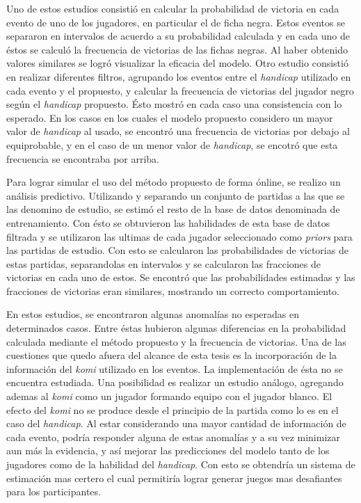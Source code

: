 \documentclass[11pt,twoside,spanish]{report} %
\begin{document}
Uno de estos estudios consisti\'o en calcular la probabilidad de victoria en cada evento de uno de los jugadores, en particular el de ficha negra.
Estos eventos se separaron en intervalos de acuerdo a su probabilidad calculada y en cada uno de \'estos se calcul\'o la frecuencia de victorias de las fichas negras.
Al haber obtenido valores similares se logr\'o visualizar la eficacia del modelo.
Otro estudio consisti\'o en realizar diferentes filtros, agrupando los eventos entre el \textit{handicap} utilizado en cada evento y el propuesto, y calcular la frecuencia de victorias del jugador negro seg\'un el \textit{handicap} propuesto.
\'Esto mostr\'o en cada caso una consistencia con lo esperado.
En los casos en los cuales el modelo propuesto considero un mayor valor de \textit{handicap} al usado, se encontr\'o una frecuencia de victorias por debajo al equiprobable, y en el caso de un menor valor de \textit{handicap}, se encotr\'o que esta frecuencia se encontraba por arriba.

Para lograr simular el uso del m\'etodo propuesto de forma \'online, se realizo un  an\'alisis predictivo.
Utilizando y separando un conjunto de partidas a las que se las denomino de estudio, se estim\'o el resto de la base de datos denominada de entrenamiento.
Con \'esto se obtuvieron las habilidades de esta base de datos filtrada y se utilizaron las ultimas de cada jugador seleccionado como \textit{priors} para las partidas de estudio.
Con esto se calcularon las probabilidades de victorias de estas partidas, separandolas en intervalos y se calcularon las fracciones de victorias en cada uno de estos.
Se encontr\'o que las probabilidades estimadas y las fracciones de victorias eran similares, mostrando un correcto comportamiento.

En estos estudios, se encontraron algunas anomal\'ias no esperadas en determinados casos.
Entre \'estas hubieron algunas diferencias en la probabilidad calculada mediante el m\'etodo propuesto y la frecuencia de victorias.
Una de las cuestiones que quedo afuera del alcance de esta tesis es la incorporaci\'on de la informaci\'on del \textit{komi} utilizado en los eventos.
La implementaci\'on de \'esta no se encuentra estudiada.
Una posibilidad es realizar un estudio an\'alogo, agregando ademas al \textit{komi} como un jugador formando equipo con el jugador blanco.
El efecto del \textit{komi} no se produce desde el principio de la partida como lo es en el caso del \textit{handicap}.
Al estar considerando una mayor cantidad de informaci\'on de cada evento, podr\'ia responder alguna de estas anomal\'ias y a su vez minimizar aun m\'as la evidencia, y as\'i mejorar las predicciones del modelo tanto de los jugadores como de la habilidad del \textit{handicap}.
Con esto se obtendr\'ia un sistema de estimaci\'on mas certero el cual permitir\'ia lograr generar juegos mas desafiantes para los participantes.
\end{document}

